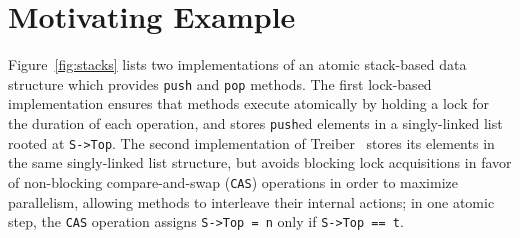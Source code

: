 
\section{Motivating Example}
\label{sec:motivation}

Figure~\ref{fig:stacks} lists two implementations of an atomic stack-based data
structure which provides {\tt push} and {\tt pop} methods. The first lock-based
implementation ensures that methods execute atomically by holding a lock for
the duration of each operation, and stores {\tt push}ed elements in a
singly-linked list rooted at {\tt S->Top}. The second implementation of
Treiber~\cite{Treiber'86} stores its elements in the same singly-linked list
structure, but avoids blocking lock acquisitions in favor of non-blocking
compare-and-swap ({\tt CAS}) operations in order to maximize parallelism,
allowing methods to interleave their internal actions; in one atomic step, the
{\tt CAS} operation assigns {\tt S->Top = n} only if {\tt S->Top == t}.

